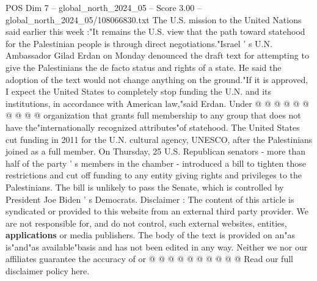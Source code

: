\begin{textsample}{POS Dim 7 – global\_north\_2024\_05 – Score 3.00 – global\_north\_2024\_05/108066830.txt}
The U.S. mission to the United Nations said earlier this week :"It remains the U.S. view that the path toward statehood for the Palestinian people is through direct negotiations."Israel ' s U.N.
Ambassador Gilad Erdan on Monday denounced the draft text for attempting to give the Palestinians the de facto status and rights of a state.
He said the adoption of the text would not change anything on the ground."If it is approved, I expect the United States to completely stop funding the U.N. and its institutions, in accordance with American law,"said Erdan.
Under @ @ @ @ @ @ @ @ @ @ organization that grants full membership to any group that does not have the"internationally recognized attributes"of statehood.
The United States cut funding in 2011 for the U.N. cultural agency, UNESCO, after the Palestinians joined as a full member.
On Thursday, 25 U.S.
Republican senators - more than half of the party ' s members in the chamber - introduced a bill to tighten those restrictions and cut off funding to any entity giving rights and privileges to the Palestinians.
The bill is unlikely to pass the Senate, which is controlled by President Joe Biden ' s Democrats.
Disclaimer : The content of this article is syndicated or provided to this website from an external third party provider.
We are not responsible for, and do not control, such external websites, entities, \textbf{applications} or media publishers.
The body of the text is provided on an"as is"and"as available"basis and has not been edited in any way.
Neither we nor our affiliates guarantee the accuracy of or @ @ @ @ @ @ @ @ @ @ Read our full disclaimer policy here.

\end{textsample}
